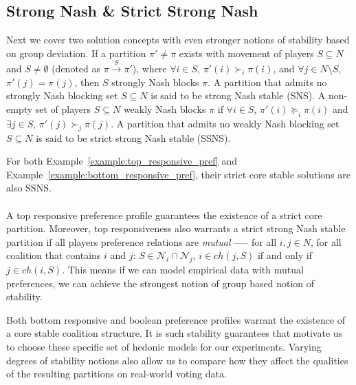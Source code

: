 \subsection{Strong Nash \& Strict Strong Nash}
\label{subsec:strong_nash_strict_strong_nash}
Next we cover two solution concepts with even stronger notions of stability
based on group deviation.
If a partition $\pi' \neq \pi$ exists with movement of players $S \subseteq N$
and $S \neq \emptyset$ (denoted as $\pi \xrightarrow{S} \pi'$), where
$\forall i \in S$, $\pi'(i) \succ_i \pi(i)$,
and $\forall j \in N\text{\textbackslash}S$, $\pi'(j) = \pi(j)$,
then $S$ strongly Nash blocks $\pi$.
A partition that admits no strongly Nash blocking set $S \subseteq N$ is said
to be strong Nash stable (SNS).
A non-empty set of players $S \subseteq N$ weakly Nash blocks $\pi$ if
$\forall i \in S$, $\pi'(i) \succeq_i \pi(i)$ and $\exists j \in S$,
$\pi'(j) \succ_j \pi(j)$.
A partition that admits no weakly Nash blocking set $S \subseteq N$ is said to
be strict strong Nash stable (SSNS).

For both Example~\ref{example:top_responsive_pref} and
Example~\ref{example:bottom_responsive_pref}, their strict core stable solutions
are also SSNS.

\paragraph{}
A top responsive preference profile guarantees the existence of a strict core partition.
Moreover, top responsiveness also warrants a strict strong Nash stable partition
if all players preference relations are \textit{mutual} ––– for all $i, j \in N$,
for all coalition that contains $i$ and $j$:
$S \in \mathcal{N}_i \cap \mathcal{N}_j$, $i \in ch(j, S)$ if and only if
$j \in ch(i, S)$.
This means if we can model empirical data with mutual preferences,
we can achieve the strongest notion of group based notion of stability.

Both bottom responsive and boolean preference profiles warrant the existence of
a core stable coalition structure.
It is such stability guarantees that motivate us to choose these specific set
of hedonic models for our experiments.
Varying degrees of stability notions also allow us to compare how they affect
the qualities of the resulting partitions on real-world voting data.


